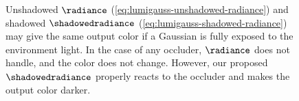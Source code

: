 {{{
      }
    }
}

\begin{figure}[!t]
  \centering
  \shadowedunshadowed
  \caption{
    Unshadowed $\radiance$ (\cref{eq:lumigauss-unshadowed-radiance}) and
    shadowed $\shadowedradiance$ (\cref{eq:lumigauss-shadowed-radiance}) may
    give the same output color if a Gaussian is fully exposed to the
    environment light.
    In the case of any occluder, $\radiance$ does not handle, and the color
    does not change.
    However, our proposed $\shadowedradiance$ properly reacts to the occluder
    and makes the output color darker.
  }

  \label{fig:lumigauss-shadowed_unshadowed}
\end{figure}